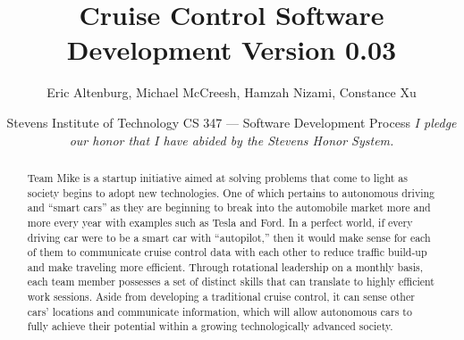 \documentclass[preprint,11pt,3p]{article}
\title{Cruise Control Software Development Version 0.03}
\author{
Eric Altenburg, Michael McCreesh, Hamzah Nizami, Constance Xu}
\date{
	Stevens Institute of Technology\endgraf\bigskip
	CS 347 — Software Development Process\endgraf\bigskip
	\textit{I pledge our honor that I have abided by the Stevens Honor System.}}
\begin{document}
\maketitle
\newpage

\tableofcontents
\newpage

\begin{abstract}
	Team Mike is a startup initiative aimed at solving problems that come to light as
society begins to adopt new technologies. One of which pertains to autonomous
driving and “smart cars” as they are beginning to break into the automobile
market more and more every year with examples such as Tesla and Ford. In a
perfect world, if every driving car were to be a smart car with “autopilot,” then
it would make sense for each of them to communicate cruise control data with
each other to reduce traffic build-up and make traveling more efficient. Through
rotational leadership on a monthly basis, each team member possesses a set of
distinct skills that can translate to highly efficient work sessions. Aside from
developing a traditional cruise control, it can sense other cars’ locations and
communicate information, which will allow autonomous cars to fully achieve
their potential within a growing technologically advanced society.
\end{abstract}
\end{document}
